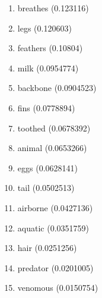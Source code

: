 \begin{enumerate}
\item breathes (0.123116)
\item legs (0.120603)
\item feathers (0.10804)
\item milk (0.0954774)
\item backbone (0.0904523)
\item fins (0.0778894)
\item toothed (0.0678392)
\item animal (0.0653266)
\item eggs (0.0628141)
\item tail (0.0502513)
\item airborne (0.0427136)
\item aquatic (0.0351759)
\item hair (0.0251256)
\item predator (0.0201005)
\item venomous (0.0150754)
\end{enumerate}